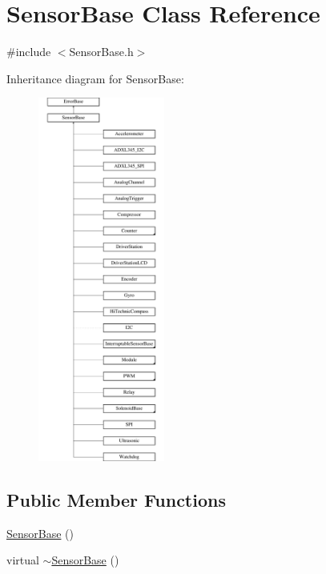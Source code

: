 \hypertarget{classSensorBase}{\section{\-Sensor\-Base \-Class \-Reference}
\label{classSensorBase}
}


{\ttfamily \#include $<$\-Sensor\-Base.\-h$>$}

\-Inheritance diagram for \-Sensor\-Base\-:\begin{figure}[H]
\begin{center}
\leavevmode
\includegraphics[height=12.000000cm]{classSensorBase}
\end{center}
\end{figure}
\subsection*{\-Public \-Member \-Functions}
\begin{DoxyCompactItemize}
\item 
\hyperlink{classSensorBase_a4e1878930538022da5ac42038d754e0e}{\-Sensor\-Base} ()
\item 
virtual \hyperlink{classSensorBase_af38b2b0e047cb4f0304fc4c204c420fa}{$\sim$\-Sensor\-Base} ()
\end{DoxyCompactItemize}
